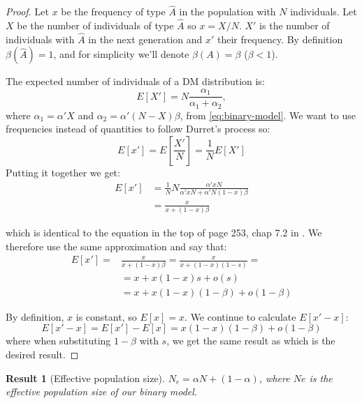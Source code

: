 \documentclass[12pt]{extarticle}
\newtheorem{result}{Result}
\begin{document}
\begin{proof}
Let $x$ be the frequency of type $\hat{A}$ in the population with $N$ individuals. Let $X$ be the number of individuals of type $\hat{A}$ so $x=X/N$. $X'$ is the number of individuals with $\hat{A}$ in the next generation and $x'$ their frequency.
By definition $\beta(\hat{A})=1$, and for simplicity we'll denote $\beta(A)=\beta$ ($\beta<1$).

The expected number of individuals of a DM distribution is:
\begin{equation}
E[X'] = N  \frac{\alpha_1}{\alpha_1+\alpha_2},
\end{equation}
where $\alpha_1 = \alpha' X$ and $\alpha_2 = \alpha'(N-X)\beta$, from  \cref{eq:binary-model}.
We want to use frequencies instead of quantities to follow Durret's process so:
\begin{equation}
E[x'] = E[\frac{X'}{N}] = \frac{1}{N}E[X']
\end{equation}
Putting it together we get:
\begin{equation}
\begin{split}
E[x'] &= \frac{1}{N}N\frac{\alpha' xN}{\alpha' xN + \alpha' N (1-x)\beta}\\
	 &= \frac{x}{x + (1-x)\beta}
\end{split}
\end{equation}

which is identical to the equation in the top of page 253, chap 7.2 in \citet{durret}. We therefore use the same approximation and say that:
\begin{equation}
\begin{split}
E[x'] =& \frac{x}{x + (1-x)\beta} = \frac{x}{x + (1-x)(1-s)} =\\
 &= x + x(1-x)s + o(s)\\
  &= x + x(1-x)(1-\beta) + o(1-\beta)
\end{split}
\end{equation}

By definition, $x$ is constant, so $E[x] = x$. We continue to calculate $E[x'-x]$:
\begin{equation}\label{eq:expec_freq}
E[x'-x] = E[x'] - E[x] = x(1-x)(1-\beta) + o(1-\beta)
\end{equation}
where when substituting $1-\beta$ with $s$, we get the same result as \citet{durret} which is the desired result.
\end{proof}

\begin{result}[Effective population size]
$N_e=\alpha N + (1-\alpha)$, where $Ne$ is the effective population size of our binary model.
\end{result}
\end{document}
